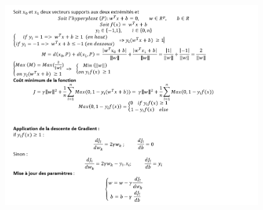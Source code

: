 \begin{figure}[h]
\begin{center}
\includegraphics[width=15cm,height=13cm]{images/svm_equation.png}

\label{monlabel}
\end{center}
\end{figure}
\newpage

